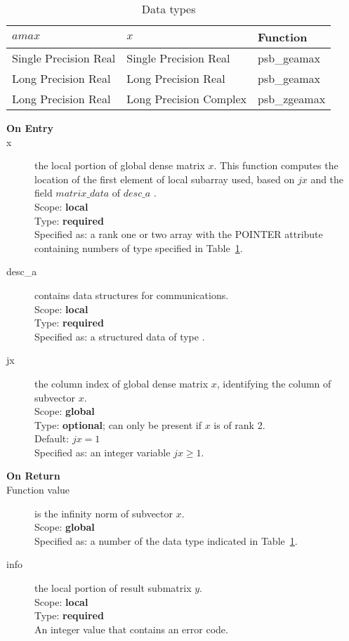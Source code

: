 
\begin{table}[h]
\begin{center}
\begin{tabular}{lll}
\hline
$amax$ & $x$ & {\bf Function}\\
\hline
Single Precision Real&Single Precision Real & psb\_geamax\\
Long Precision Real&Long Precision Real & psb\_geamax \\
Long Precision Real&Long Precision Complex & psb\_zgeamax \\
\hline
\end{tabular}
\end{center}
\caption{Data types\label{tab:f90amax}}
\end{table}


\begin{description}
\item[\bf On Entry]
\item[x] the local portion of global dense matrix
$x$. This function computes the location of the first element of
local subarray used, based on $jx$ and the field $matrix\_data$ of $desc\_a$ . \\
Scope: {\bf local} \\
Type: {\bf required} \\
Specified as:  a rank one or two array with the POINTER attribute 
containing numbers of type specified in
Table~\ref{tab:f90amax}.
\item[desc\_a] contains data structures for communications.\\
Scope: {\bf local} \\
Type: {\bf required}\\
Specified as: a structured data of type \descdata.
\item[jx]  the column index of global dense matrix $x$,
identifying the column of subvector $x$.\\
Scope: {\bf global} \\
Type: {\bf optional}; can only be present if $x$ is of rank 2.\\	
Default: $jx = 1$\\	
Specified as: an integer variable $jx\ge 1$. 

\item[\bf On Return] 
\item[Function value] is the infinity norm of subvector $x$.\\
Scope: {\bf global} \\
Specified as: a number of the data type indicated in Table~\ref{tab:f90amax}.
\item[info] the local portion of result submatrix $y$.\\
Scope: {\bf local} \\
Type: {\bf required} \\
An integer value that contains an error code. 
\end{description}
%
%

